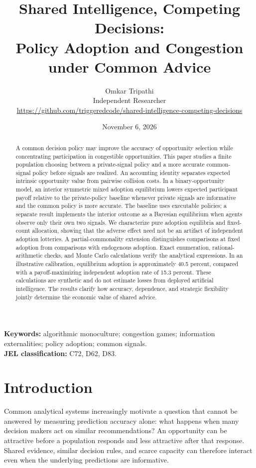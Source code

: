 \documentclass[11pt,a4paper]{article}
\title{Shared Intelligence, Competing Decisions:\\Policy Adoption and Congestion under Common Advice}
\author{Omkar Tripathi\\\small Independent Researcher\\\small\url{https://github.com/triggeredcode/shared-intelligence-competing-decisions}}
\date{November 6, 2026}
\theoremstyle{definition}
\theoremstyle{remark}
\begin{document}
\maketitle
\begin{abstract}
A common decision policy may improve the accuracy of opportunity selection while concentrating participation in congestible opportunities. This paper studies a finite population choosing between a private-signal policy and a more accurate common-signal policy before signals are realized. An accounting identity separates expected intrinsic opportunity value from pairwise collision costs. In a binary-opportunity model, an interior symmetric mixed adoption equilibrium lowers expected participant payoff relative to the private-policy baseline whenever private signals are informative and the common policy is more accurate. The baseline uses executable policies; a separate result implements the interior outcome as a Bayesian equilibrium when agents observe only their own two signals. We characterize pure adoption equilibria and fixed-count allocation, showing that the adverse effect need not be an artifact of independent adoption lotteries. A partial-commonality extension distinguishes comparisons at fixed adoption from comparisons with endogenous adoption. Exact enumeration, rational-arithmetic checks, and Monte Carlo calculations verify the analytical expressions. In an illustrative calibration, equilibrium adoption is approximately 40.5 percent, compared with a payoff-maximizing independent adoption rate of 15.3 percent. These calculations are synthetic and do not estimate losses from deployed artificial intelligence. The results clarify how accuracy, dependence, and strategic flexibility jointly determine the economic value of shared advice.
\end{abstract}
\noindent\textbf{Keywords:} algorithmic monoculture; congestion games; information externalities; policy adoption; common signals.\\
\textbf{JEL classification:} C72, D62, D83.

\section{Introduction}
Common analytical systems increasingly motivate a question that cannot be answered by measuring prediction accuracy alone: what happens when many decision makers act on similar recommendations? An opportunity can be attractive before a population responds and less attractive after that response. Shared evidence, similar decision rules, and scarce capacity can therefore interact even when the underlying predictions are informative.
\end{document}
